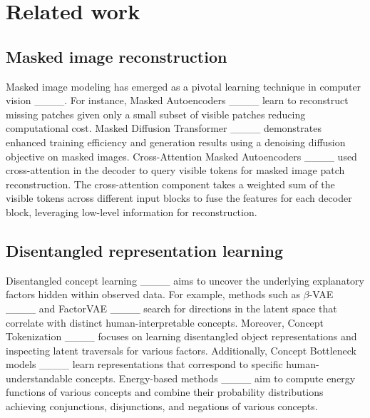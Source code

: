 \section{Related work}
\subsection{Masked image reconstruction}

Masked image modeling has emerged as a pivotal learning technique in computer vision ____. For instance, Masked Autoencoders ____ learn to reconstruct missing patches given only a small subset of visible patches reducing computational cost. Masked Diffusion Transformer ____ demonstrates enhanced training efficiency and generation results using a denoising diffusion objective on masked images. Cross-Attention Masked Autoencoders ____ used cross-attention in the decoder to query visible tokens for masked image patch reconstruction. The cross-attention component takes a weighted sum of the visible tokens across different input blocks to fuse the features for each decoder block, leveraging low-level information for reconstruction.

\subsection{Disentangled representation learning}

Disentangled concept learning ____ aims to uncover the underlying explanatory factors hidden within observed data. For example, methods such as $\beta$-VAE ____ and FactorVAE ____ search for directions in the latent space that correlate with distinct human-interpretable concepts. Moreover, Concept Tokenization ____ focuses on learning disentangled object representations and inspecting latent traversals for various factors. Additionally, Concept Bottleneck models ____ learn representations that correspond to specific human-understandable concepts. Energy-based methods ____ aim to compute energy functions of various concepts and combine their probability distributions achieving conjunctions, disjunctions, and negations of various concepts.

